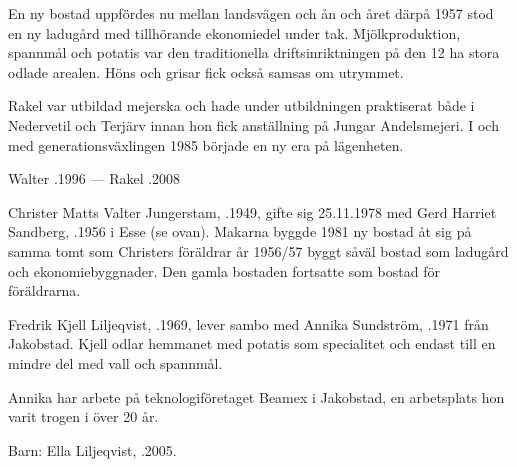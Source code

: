 En ny bostad uppfördes nu mellan landsvägen och ån och året därpå 1957 stod en ny ladugård med tillhörande ekonomiedel under tak. Mjölkproduktion, spannmål och potatis var den traditionella driftsinriktningen på den 12 ha stora odlade arealen. Höns och grisar fick också samsas om utrymmet.

Rakel var utbildad mejerska och hade under utbildningen praktiserat både i Nedervetil och Terjärv innan hon fick anställning på Jungar Andelsmejeri. I och med generationsväxlingen 1985 började en ny era på lägenheten.
\begin{jhchildren}
  \item {}
  \item {}
\end{jhchildren}

Walter .1996  ---  Rakel .2008






Christer Matts Valter Jungerstam, .1949, gifte sig 25.11.1978 med Gerd Harriet Sandberg, .1956 i Esse (se ovan). Makarna byggde 1981 ny bostad åt sig på samma tomt som Christers föräldrar år 1956/57 byggt såväl bostad som ladugård och ekonomiebyggnader. Den gamla bostaden fortsatte som bostad för föräldrarna.






Fredrik Kjell Liljeqvist, .1969, lever sambo med Annika Sundström, .1971 från Jakobstad.  Kjell odlar hemmanet med potatis som specialitet och endast till en mindre del med vall och spannmål.

Annika har arbete på teknologiföretaget Beamex i Jakobstad, en arbetsplats hon varit trogen i över 20 år.

Barn: Ella Liljeqvist, .2005.


